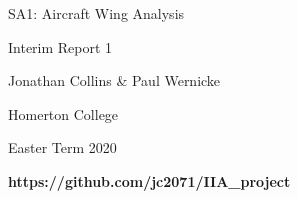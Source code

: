 \begin{titlepage}
    \begin{center}
 
        \LARGE
        SA1: Aircraft Wing Analysis
        
        \vspace{0.1cm}
        
        \LARGE
        
        Interim Report 1
        
        \vspace{0.4cm}
        
        \large
        
        Jonathan Collins \& Paul Wernicke
        
        \vspace{0cm}
        
        Homerton College
        
        \vspace{0.3cm}
        
        Easter Term 2020
        
        \vspace{0.5cm}
        
        \textbf{https://github.com/jc2071/IIA\_project}
        
        \vspace{0.5cm}
        
        
        
        
        \lstlistoflistings
        \listoffigures
    \end{center}
\end{titlepage}